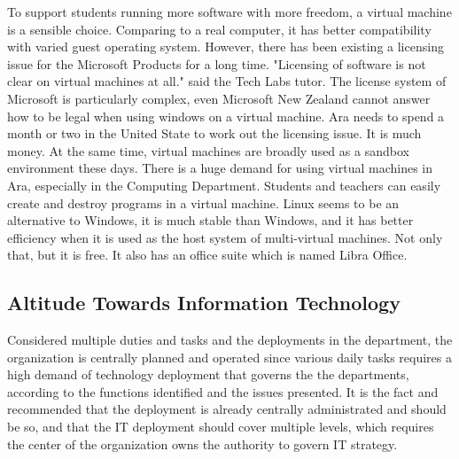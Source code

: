 To support students running more software with more freedom, a virtual machine is a sensible choice. Comparing to a real computer, it has better compatibility with varied guest operating system. However, there has been existing a licensing issue for the Microsoft Products for a long time. "Licensing of software is not clear on virtual machines at all." said the Tech Labs tutor. The license system of Microsoft is particularly complex, even Microsoft New Zealand cannot answer how to be legal when using windows on a virtual machine. Ara needs to spend a month or two in the United State to work out the licensing issue. It is much money. At the same time, virtual machines are broadly used as a sandbox environment these days. There is a huge demand for using virtual machines in Ara, especially in the Computing Department. Students and teachers can easily create and destroy programs in a virtual machine. Linux seems to be an alternative to Windows, it is much stable than Windows, and it has better efficiency when it is used as the host system of multi-virtual machines. Not only that, but it is free. It also has an office suite which is named Libra Office.


\subsection{Altitude Towards Information Technology}
Considered multiple duties and tasks and the deployments in the department, the organization is centrally planned and operated since various daily tasks requires a high demand of technology deployment that governs the the departments, according to the functions identified and the issues presented. It is the fact and recommended that the deployment is already centrally administrated and should be so, and that the IT deployment should cover multiple levels, which requires the center of the organization owns the authority to govern IT strategy.
